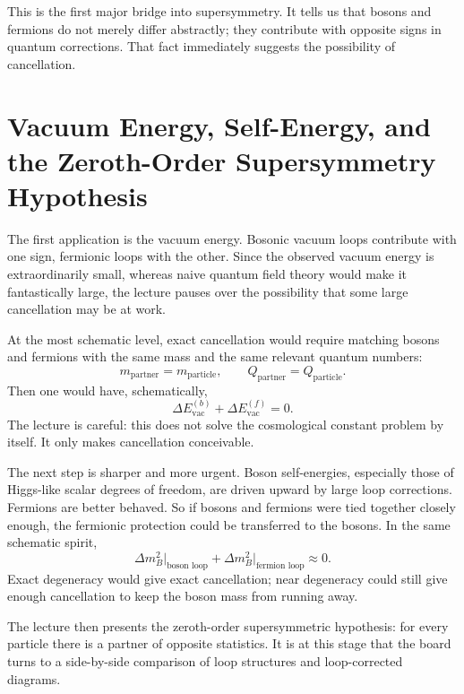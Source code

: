 This is the first major bridge into supersymmetry. It tells us that bosons and fermions do not merely differ abstractly; they contribute with opposite signs in quantum corrections. That fact immediately suggests the possibility of cancellation.

\section{Vacuum Energy, Self-Energy, and the Zeroth-Order Supersymmetry Hypothesis}

The first application is the vacuum energy. Bosonic vacuum loops contribute with one sign, fermionic loops with the other. Since the observed vacuum energy is extraordinarily small, whereas naive quantum field theory would make it fantastically large, the lecture pauses over the possibility that some large cancellation may be at work.

At the most schematic level, exact cancellation would require matching bosons and fermions with the same mass and the same relevant quantum numbers:
\begin{equation}
m_{\text{partner}}=m_{\text{particle}},
\qquad
Q_{\text{partner}}=Q_{\text{particle}}.
\end{equation}
Then one would have, schematically,
\begin{equation}
\Delta E_{\mathrm{vac}}^{(b)}+\Delta E_{\mathrm{vac}}^{(f)}=0.
\end{equation}
The lecture is careful: this does not solve the cosmological constant problem by itself. It only makes cancellation conceivable.

The next step is sharper and more urgent. Boson self-energies, especially those of Higgs-like scalar degrees of freedom, are driven upward by large loop corrections. Fermions are better behaved. So if bosons and fermions were tied together closely enough, the fermionic protection could be transferred to the bosons. In the same schematic spirit,
\begin{equation}
\Delta m_B^2\big|_{\text{boson loop}}
+
\Delta m_B^2\big|_{\text{fermion loop}}
\approx 0.
\end{equation}
Exact degeneracy would give exact cancellation; near degeneracy could still give enough cancellation to keep the boson mass from running away.

The lecture then presents the zeroth-order supersymmetric hypothesis: for every particle there is a partner of opposite statistics. It is at this stage that the board turns to a side-by-side comparison of loop structures and loop-corrected diagrams.

